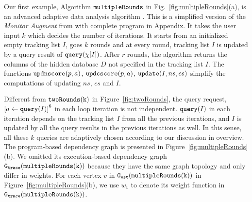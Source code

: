 \begin{example}
\label{ex:multipleRounds}
%
Our first example, Algorithm $\mathtt{multipleRounds}$ in Fig.~\ref{fig:multipleRounds}(a), is an advanced adaptive data analysis algorithm .
This is a simplified version of the \emph{Monitor Augment} from \cite{RogersRSSTW20} with complete program in Appendix.
It takes the user input $k$ which decides the 
number of iterations.
It starts from an initialized empty tracking list $I$,
goes $k$ rounds and at every round, tracking list $I$ is updated by a query result of ${\tt query}(\chi[I])$.
After $r$ rounds, the algorithm returns the columns of the hidden database $D$ not specified in the tracking list $I$.
The functions $\mathtt{updnscore}(p,a)$,
$\mathtt{updcscore}(p,a)$, $\mathtt{update}(I,ns,cs)$ simplify the computations of updating $ns$, $cs$ and $I$.%

    Different from $\mathtt{twoRounds(k)}$ in Figure~\ref{fig:twoRounds},
the query request, $\clabel{\assign{a}{\query(I)}}^6$ in each loop iteration is not independent. 
${\tt query}(I)$ in each iteration depends on the tracking list $I$ from all the previous iterations, 
and $I$ is updated by all the query results in the previous iterations as well. 
In this sense, all these $k$ queries are adaptively chosen according to our discussion in overview.
The program-based dependency graph is presented in Figure~\ref{fig:multipleRounds}(b). 
We omitted its execution-based dependency graph $\mathtt{{G_{trace}}}(\mathtt{multipleRounds(k)})$ because they have the same graph topology and only differ in weights.
For each vertex $v$ in $\mathtt{{G_{est}}}(\mathtt{multipleRounds(k)})$ in Figure~\ref{fig:multipleRounds}(b),
we use $w_{v}$ to denote its weight function in $\mathtt{{G_{trace}}}(\mathtt{multipleRounds(k)})$.


\end{example}
